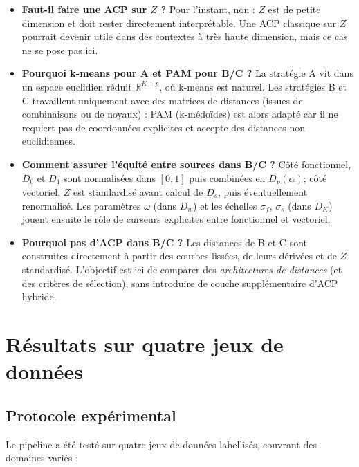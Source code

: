 \documentclass[11pt, a4paper]{article}
\newcommand{\R}{\mathbb{R}}
\newcommand{\Dp}{D_p}
\newcommand{\Dw}{D_w}
\newcommand{\DK}{D_K}
\begin{document}
\begin{itemize}[nosep]
  \item \textbf{Faut-il faire une ACP sur $Z$ ?} Pour l'instant, non :
    $Z$ est de petite dimension et doit rester directement
    interprétable. Une ACP classique sur $Z$ pourrait devenir utile dans
    des contextes à très haute dimension, mais ce cas ne se pose pas
    ici.
  \item \textbf{Pourquoi k-means pour A et PAM pour B/C ?} La stratégie
    A vit dans un espace euclidien réduit $\R^{K+p}$, où k-means est
    naturel. Les stratégies B et C travaillent uniquement avec des
    matrices de distances (issues de combinaisons ou de noyaux) :
    PAM (k-médoïdes) est alors adapté car il ne requiert pas de
    coordonnées explicites et accepte des distances non euclidiennes.
  \item \textbf{Comment assurer l'équité entre sources dans B/C ?}
    Côté fonctionnel, $D_0$ et $D_1$ sont normalisées dans $[0,1]$ puis
    combinées en $\Dp(\alpha)$; côté vectoriel, $Z$ est standardisé
    avant calcul de $D_s$, puis éventuellement renormalisé. Les
    paramètres $\omega$ (dans $\Dw$) et les échelles $\sigma_f$,
    $\sigma_s$ (dans $\DK$) jouent ensuite le rôle de curseurs explicites
    entre fonctionnel et vectoriel.
  \item \textbf{Pourquoi pas d'ACP dans B/C ?} Les distances de B et C
    sont construites directement à partir des courbes lissées, de leurs
    dérivées et de $Z$ standardisé. L'objectif est ici de comparer des
    \emph{architectures de distances} (et des critères de sélection),
    sans introduire de couche supplémentaire d'ACP hybride.
\end{itemize}

\newpage
\section{Résultats sur quatre jeux de données}

\subsection{Protocole expérimental}

Le pipeline a été testé sur quatre jeux de données labellisés, couvrant des
domaines variés :
\end{document}

